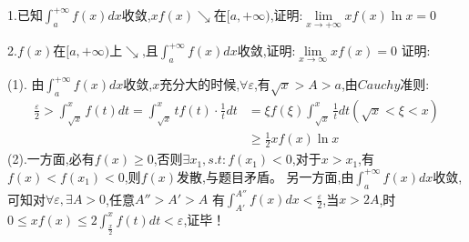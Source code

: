 \documentclass{ctexart}
\begin{document}
\begin{tcolorbox}[title = {综合性问题},colbacktitle=red!25!white,colback=white,arc = 2mm, outer arc = 2mm,fonttitle = \itshape, fontupper = \itshape, fontlower = \itshape]
\begin{tcolorbox}[title = {类似},colbacktitle=green!35!black,colback=white,arc = 3mm, outer arc = 3mm,fonttitle = \itshape, fontupper = \itshape, fontlower = \itshape]
   		1.已知$\displaystyle{\int_{a}^{+\infty}f(x)dx}$收敛,$xf(x) \searrow$在$[a,+\infty)$,证明:$\lim\limits_{x \to +\infty} xf(x) \ln x=0$
   		
   		2.$f(x)$在$[a,+\infty)$上$\searrow$,且$\displaystyle{\int_{a}^{+\infty}f(x)dx}$收敛,证明:$\lim\limits_{x \to \infty}xf(x)=0$
   		    	{\color{red}证明:}
   		
   		(1).
   		由$\displaystyle{\int_{a}^{+\infty}f(x)dx}$收敛,$x$充分大的时候,$\forall \varepsilon$,有$\sqrt{x} > A> a$,由$Cauchy$准则:
   		$$
   		\begin{aligned}
   			\frac{\varepsilon}{2}>\int_{\sqrt{x}}^{x}f(t)dt =\int_{\sqrt{x}}^{x}tf(t) \cdot \frac{1}{t}dt 
   			&=\xi f(\xi) \int_{\sqrt{x}}^{x}\frac{1}{t}dt \left(\sqrt{x} <\xi < x \right) \\  
   			& \ge \frac{1}{2}xf(x)\ln x
   		\end{aligned} $$
   		\tcblower
   		(2).一方面,必有$f(x) \ge 0$,否则$\exists x_{1},s.t:f(x_{1}) < 0 $,对于$x > x_{1}$,有$f(x) < f(x_{1})<0$,则$f(x)$发散,与题目矛盾。
   		另一方面,由$\displaystyle{\int_{a}^{+\infty}f(x)dx}$收敛,可知对$\forall \varepsilon ,\exists A > 0$,任意$A'' > A'> A$
   		有$\displaystyle{\int_{A'}^{A''}f(x)dx} < \frac{\varepsilon}{2}$,当$x > 2A$,时
   		$\displaystyle{0 \le xf(x) \le 2\int_{\frac{x}{2}}^{x}f(t)dt} < \varepsilon$,证毕！
   	\end{tcolorbox}
    \end{tcolorbox}
\end{document}
